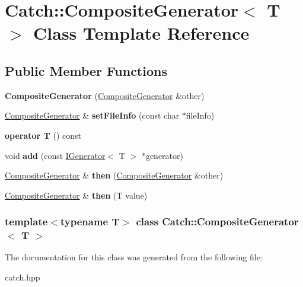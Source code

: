 \hypertarget{classCatch_1_1CompositeGenerator}{
\section{Catch::CompositeGenerator$<$ T $>$ Class Template Reference}
\label{classCatch_1_1CompositeGenerator}
}
\subsection*{Public Member Functions}
\begin{DoxyCompactItemize}
\item 
\hypertarget{classCatch_1_1CompositeGenerator_a21a7070a00e4a6fe021294c356692692}{
{\bfseries CompositeGenerator} (\hyperlink{classCatch_1_1CompositeGenerator}{CompositeGenerator} \&other)}
\label{classCatch_1_1CompositeGenerator_a21a7070a00e4a6fe021294c356692692}

\item 
\hypertarget{classCatch_1_1CompositeGenerator_ac3c57cf4ca5472f440bf71e2936bcd4a}{
\hyperlink{classCatch_1_1CompositeGenerator}{CompositeGenerator} \& {\bfseries setFileInfo} (const char $\ast$fileInfo)}
\label{classCatch_1_1CompositeGenerator_ac3c57cf4ca5472f440bf71e2936bcd4a}

\item 
\hypertarget{classCatch_1_1CompositeGenerator_aa3f627d84fb256df0404d19d7fd4b784}{
{\bfseries operator T} () const }
\label{classCatch_1_1CompositeGenerator_aa3f627d84fb256df0404d19d7fd4b784}

\item 
\hypertarget{classCatch_1_1CompositeGenerator_af3774d42ad2d3453d089ca599efe0517}{
void {\bfseries add} (const \hyperlink{structCatch_1_1IGenerator}{IGenerator}$<$ T $>$ $\ast$generator)}
\label{classCatch_1_1CompositeGenerator_af3774d42ad2d3453d089ca599efe0517}

\item 
\hypertarget{classCatch_1_1CompositeGenerator_a2e03f42df85cdd238aabd77a80b075d5}{
\hyperlink{classCatch_1_1CompositeGenerator}{CompositeGenerator} \& {\bfseries then} (\hyperlink{classCatch_1_1CompositeGenerator}{CompositeGenerator} \&other)}
\label{classCatch_1_1CompositeGenerator_a2e03f42df85cdd238aabd77a80b075d5}

\item 
\hypertarget{classCatch_1_1CompositeGenerator_aefdc11bcfccdf07d2db5f0da3ed8758c}{
\hyperlink{classCatch_1_1CompositeGenerator}{CompositeGenerator} \& {\bfseries then} (T value)}
\label{classCatch_1_1CompositeGenerator_aefdc11bcfccdf07d2db5f0da3ed8758c}

\end{DoxyCompactItemize}
\subsubsection*{template$<$typename T$>$ class Catch::CompositeGenerator$<$ T $>$}



The documentation for this class was generated from the following file:\begin{DoxyCompactItemize}
\item 
catch.hpp\end{DoxyCompactItemize}
